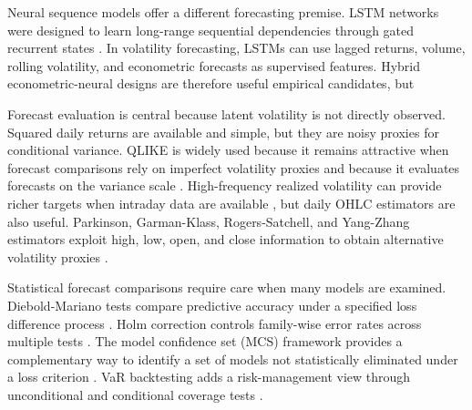 Neural sequence models offer a different forecasting premise. LSTM networks were designed to learn long-range sequential dependencies through gated recurrent states \cite{hochreiter1997lstm}. In volatility forecasting, LSTMs can use lagged returns, volume, rolling volatility, and econometric forecasts as supervised features. Hybrid econometric-neural designs are therefore useful empirical candidates, but 

Forecast evaluation is central because latent volatility is not directly observed. Squared daily returns are available and simple, but they are noisy proxies for conditional variance. QLIKE is widely used because it remains attractive when forecast comparisons rely on imperfect volatility proxies and because it evaluates forecasts on the variance scale \cite{patton2011volatility}. High-frequency realized volatility can provide richer targets when intraday data are available \cite{andersen2003realized}, but daily OHLC estimators are also useful. Parkinson, Garman-Klass, Rogers-Satchell, and Yang-Zhang estimators exploit high, low, open, and close information to obtain alternative volatility proxies \cite{parkinson1980extreme,garman1980estimation,rogers1991estimating,yang2000drift}.

Statistical forecast comparisons require care when many models are examined. Diebold-Mariano tests compare predictive accuracy under a specified loss difference process \cite{diebold1995predictive}. Holm correction controls family-wise error rates across multiple tests \cite{holm1979sequential}. The model confidence set (MCS) framework provides a complementary way to identify a set of models not statistically eliminated under a loss criterion \cite{hansen2011mcs}. VaR backtesting adds a risk-management view through unconditional and conditional coverage tests \cite{kupiec1995var,christoffersen1998interval}. 
